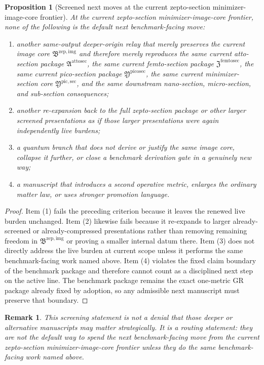 \documentclass[11pt]{article}
\newcommand{\AttoSectionPackage}{\mathfrak A^{\mathrm{attosec}}}
\newcommand{\ZeptoImageCore}{\mathfrak B^{\mathrm{zep,img}}}
\newcommand{\FemtoSectionPackage}{\mathfrak Z^{\mathrm{femtosec}}}
\newcommand{\PicoSectionPackage}{\mathfrak Y^{\mathrm{picosec}}}
\newcommand{\PicoMinSectionCore}{\mathfrak Y^{\mathrm{pic,sec}}}
\newtheorem{proposition}{Proposition}
\newtheorem{remark}{Remark}
\begin{document}
\begin{proposition}[Screened next moves at the current zepto-section minimizer-image-core frontier]
At the current zepto-section minimizer-image-core frontier, none of the following is the default next benchmark-facing move:
\begin{enumerate}
    \item another same-output deeper-origin relay that merely preserves the current image core \(\ZeptoImageCore\) and therefore merely reproduces the same current atto-section package \(\AttoSectionPackage\), the same current femto-section package \(\FemtoSectionPackage\), the same current pico-section package \(\PicoSectionPackage\), the same current minimizer-section core \(\PicoMinSectionCore\), and the same downstream nano-section, micro-section, and sub-section consequences;
    \item another re-expansion back to the full zepto-section package or other larger screened presentations as if those larger presentations were again independently live burdens;
    \item a quantum branch that does not derive or justify the same image core, collapse it further, or close a benchmark derivation gate in a genuinely new way;
    \item a manuscript that introduces a second operative metric, enlarges the ordinary matter law, or uses stronger promotion language.
\end{enumerate}
\end{proposition}

\begin{proof}
Item (1) fails the preceding criterion because it leaves the renewed live burden unchanged. Item (2) likewise fails because it re-expands to larger already-screened or already-compressed presentations rather than removing remaining freedom in \(\ZeptoImageCore\) or proving a smaller internal datum there. Item (3) does not directly address the live burden at current scope unless it performs the same benchmark-facing work named above. Item (4) violates the fixed claim boundary of the benchmark package and therefore cannot count as a disciplined next step on the active line. The benchmark package remains the exact one-metric GR package already fixed by adoption, so any admissible next manuscript must preserve that boundary.
\end{proof}

\begin{remark}
This screening statement is not a denial that those deeper or alternative manuscripts may matter strategically. It is a routing statement: they are not the default way to spend the next benchmark-facing move from the current zepto-section minimizer-image-core frontier unless they do the same benchmark-facing work named above.
\end{remark}
\end{document}
